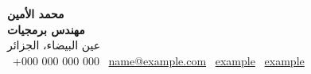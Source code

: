 \documentclass[10pt, a4paper]{article}
\makeatletter
\newcommand{\cvname}{محمد الأمين}
\newcommand{\cvtitle}{مهندس برمجيات}
\newcommand{\cvlocation}{عين البيضاء، الجزائر}
\newcommand{\cvphone}{+000 000 000 000}
\newcommand{\cvemail}{name@example.com}
\newcommand{\cvgithub}{example}
\newcommand{\cvlinkedin}{example}
\makeatother
\begin{document}
\begin{center}
  {\fontsize{30pt}{1.1em}\bfseries\textcolor{darktext}{\cvname}}\\[0.35em]
  {\fontsize{10pt}{1em}\bfseries\textcolor{awesome}{\cvtitle}}\\[0.4em]
  {\fontsize{9pt}{1em}\textcolor{lighttext}{\cvlocation}}\\[0.5em]
  {\fontsize{8.2pt}{1em}\textcolor{darktext}{
    \cvIconPhone\ \textenglish{\cvphone}
    \quad\textbar\quad
    \cvIconMail\ \href{mailto:\cvemail}{\textenglish{\cvemail}}
    \quad\textbar\quad
    \cvIconGithub\ \href{https://github.com/\cvgithub}{\textenglish{\cvgithub}}
    \quad\textbar\quad
    \cvIconLinkedin\ \href{https://www.linkedin.com/in/\cvlinkedin}{\textenglish{\cvlinkedin}}
  }}
\end{center}

\vspace{0.6em}





\end{document}
